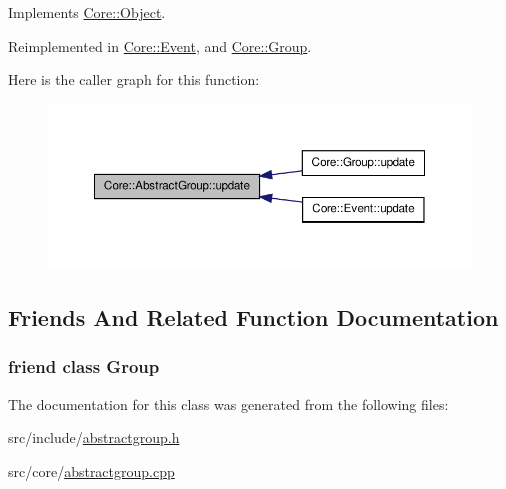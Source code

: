 Implements \hyperlink{classCore_1_1Object_a53328d659235e29f418ff4890cc3bdb3}{Core::Object}.



Reimplemented in \hyperlink{classCore_1_1Event_a8e147f35e8ee4fd0891a290424b098d3}{Core::Event}, and \hyperlink{classCore_1_1Group_a9878d4ec0b02890502c6cff69da1e332}{Core::Group}.



Here is the caller graph for this function:
\nopagebreak
\begin{figure}[H]
\begin{center}
\leavevmode
\includegraphics[width=364pt]{dd/d68/classCore_1_1AbstractGroup_a397f639a0ee32efbc5a3ead8002745d5_icgraph}
\end{center}
\end{figure}




\subsection{Friends And Related Function Documentation}
\hypertarget{classCore_1_1AbstractGroup_a2697825715974a353728f0d4d5658112}{
\subsubsection[{Group}]{\setlength{\rightskip}{0pt plus 5cm}friend class {\bf Group}}}
\label{dd/d68/classCore_1_1AbstractGroup_a2697825715974a353728f0d4d5658112}


The documentation for this class was generated from the following files:\begin{DoxyCompactItemize}
\item 
src/include/\hyperlink{abstractgroup_8h}{abstractgroup.h}\item 
src/core/\hyperlink{abstractgroup_8cpp}{abstractgroup.cpp}\end{DoxyCompactItemize}
